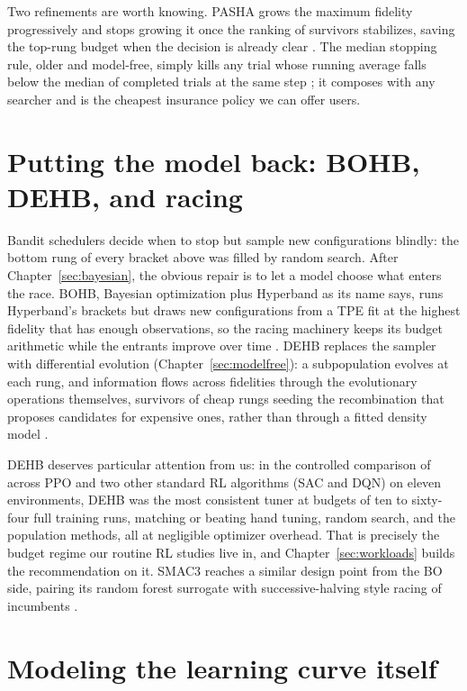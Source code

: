 Two refinements are worth knowing. PASHA grows the maximum fidelity
progressively and stops growing it once the ranking of survivors
stabilizes, saving the top-rung budget when the decision is already
clear \citep{bohdal2023pasha}. The median stopping rule, older and
model-free, simply kills any trial whose running average falls below the
median of completed trials at the same step \citep{golovin2017vizier};
it composes with any searcher and is the cheapest insurance policy we
can offer users.

\section{Putting the model back: BOHB, DEHB, and racing}

Bandit schedulers decide when to stop but sample new configurations
blindly: the bottom rung of every bracket above was filled by random
search. After Chapter~\ref{sec:bayesian}, the obvious repair is to let a
model choose what enters the race. BOHB, Bayesian optimization plus
Hyperband as its name says, runs Hyperband's brackets but
draws new configurations from a TPE fit at the highest fidelity that has
enough observations, so the racing machinery keeps its budget arithmetic
while the entrants improve over time \citep{falkner2018bohb}. DEHB
replaces the sampler with differential evolution
(Chapter~\ref{sec:modelfree}): a subpopulation evolves at each rung, and
information flows across fidelities through the evolutionary operations
themselves, survivors of cheap rungs seeding the recombination that
proposes candidates for expensive ones, rather than through a fitted
density model \citep{awad2021dehb}.

DEHB deserves particular attention from us: in the controlled comparison
of \citet{eimer2023hyperparameters} across PPO and two other standard
RL algorithms (SAC and DQN) on eleven
environments, DEHB was the most consistent tuner at budgets of ten to
sixty-four full training runs, matching or beating hand tuning, random
search, and the population methods, all at negligible optimizer
overhead. That is precisely the budget regime our routine RL studies
live in, and Chapter~\ref{sec:workloads} builds the recommendation on
it. SMAC3 reaches a similar design point from the BO side, pairing its
random forest surrogate with successive-halving style racing of
incumbents \citep{lindauer2022smac3}.

\section{Modeling the learning curve itself}

